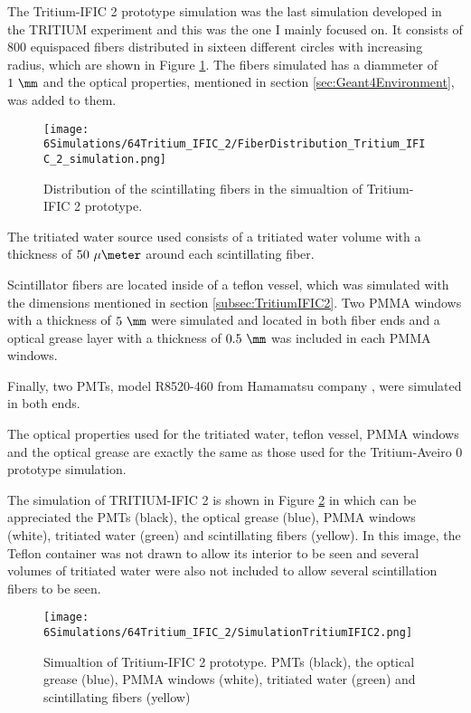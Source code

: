 The Tritium-IFIC 2 prototype simulation was the last simulation developed in the TRITIUM experiment and this was the one I mainly focused on. It consists of $800$ equispaced fibers distributed in sixteen different circles with increasing radius, which are shown in Figure \ref{fig:FibersTritiumIFIC2Simulation}. The fibers simulated has a diammeter of $1~\mm$ and the optical properties, mentioned in section \ref{sec:Geant4Environment}, was added to them.

\begin{figure}[h]
\centering
\texttt{[image: 6Simulations/64Tritium\_IFIC\_2/FiberDistribution\_Tritium\_IFIC\_2\_simulation.png]}
\caption{Distribution of the scintillating fibers in the simualtion of Tritium-IFIC 2 prototype.\label{fig:FibersTritiumIFIC2Simulation}}
\end{figure}

The tritiated water source used consists of a tritiated water volume with a thickness of $50~\mu\meter$ around each scintillating fiber.

Scintillator fibers are located inside of a teflon vessel, which was simulated with the dimensions mentioned in section \ref{subsec:TritiumIFIC2}. Two PMMA windows with a thickness of $5~\mm$ were simulated and located in both fiber ends and a optical grease layer with a thickness of $0.5~\mm$ was included in each PMMA windows.

Finally, two PMTs, model R8520-460 from Hamamatsu company \cite{DataSheetPMTs}, were simulated in both ends. 

The optical properties used for the tritiated water, teflon vessel, PMMA windows and the optical grease are exactly the same as those used for the Tritium-Aveiro 0 prototype simulation. 

The simulation of TRITIUM-IFIC 2 is shown in Figure \ref{fig:TritiumIFIC2Simulation} in which can be appreciated the PMTs (black), the optical grease (blue), PMMA windows (white), tritiated water (green) and scintillating fibers (yellow). In this image, the Teflon container was not drawn to allow its interior to be seen and several volumes of tritiated water were also not included to allow several scintillation fibers to be seen.

\begin{figure}[h]
\centering
\texttt{[image: 6Simulations/64Tritium\_IFIC\_2/SimulationTritiumIFIC2.png]}
\caption{Simualtion of Tritium-IFIC 2 prototype. PMTs (black), the optical grease (blue), PMMA windows (white), tritiated water (green) and scintillating fibers (yellow) \label{fig:TritiumIFIC2Simulation}}
\end{figure}


